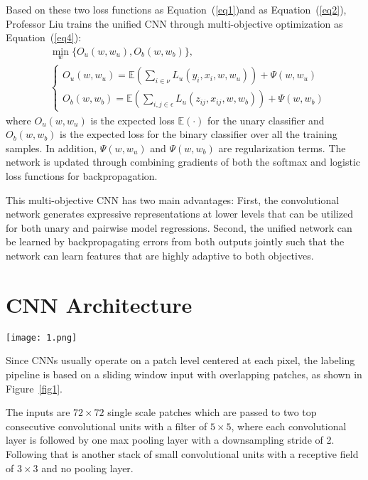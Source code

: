 \documentclass[twocolumn]{article}
\begin{document}
	Based on these two loss functions as Equation~(\ref{eq1})and as Equation~(\ref{eq2}), Professor Liu trains the unified CNN through multi-objective optimization as Equation~(\ref{eq4}):
	\begin{equation}
	\begin{split}
	&\min_w \{O_u(w,w_u),O_b(w,w_b)\}, \\
	&\begin{cases}
	O_u(w,w_u)=\mathbb{E}(\sum_{i\in \nu}L_u(y_i,x_i,w,w_u))+\Psi(w,w_u)\\
	O_b(w,w_b)=\mathbb{E}(\sum_{i,j\in \epsilon}L_u(z_{ij},x_{ij},w,w_b))+\Psi(w,w_b)
	\end{cases} \label{eq4}
	\end{split}
	\end{equation}
	where $O_u(w,w_u)$ is the expected loss $\mathbb{E}(\cdot)$ for the unary classifier and $O_b(w,w_b)$ is the expected loss for the binary classifier over all the training samples. In addition, $\Psi(w,w_u)$ and $\Psi(w,w_b)$ are regularization terms. The network is updated through combining gradients of both the softmax and logistic loss functions for backpropagation.
	
	This multi-objective CNN has two main advantages: First, the convolutional network generates expressive representations at lower levels that can be utilized for both unary and pairwise model regressions. Second, the unified network can be learned by backpropagating errors from both outputs jointly such that the network can learn features that are highly adaptive to both objectives.
	\section{CNN Architecture}
	\begin{figure*}[htbp!] 
		\begin{center} 
			\texttt{[image: 1.png]} 
			\caption{Proposed CNN classifier with sliding window based inputs.}\label{fig1}  
		\end{center}   
	\end{figure*}
	Since CNNs usually operate on a patch level centered at each pixel, the labeling pipeline is based on a sliding window input \cite{Sermanet2013OverFeat} with overlapping patches, as shown in Figure~\ref{fig1}.
	
	The inputs are $72\times 72$ single scale patches which are passed to two top consecutive convolutional units with a filter of $5\times 5$, where each convolutional layer is followed by one max pooling layer with a downsampling stride of 2. Following that is another stack of small convolutional units with a receptive field of $3\times 3$ and no pooling layer.
\end{document}
